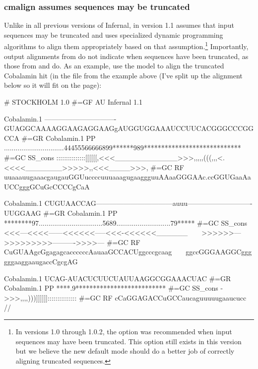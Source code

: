 \subsubsection{cmalign assumes sequences may be truncated}
Unlike in all previous versions of Infernal,  in version
1.1 assumes that input sequences may be truncated and uses specialized
dynamic programming algorithms to align them appropriately based on
that assumption.\footnote{In versions 1.0 through 1.0.2, the
    option was recommended when input
  sequences may have been truncated. This option still exists in this
  version but we believe the new default mode should do a better job
  of correctly aligning truncated sequences.} Importantly, output
alignments from  do not indicate when sequences have
been truncated, as those from  and  do. As
an example, use the  model to align the
truncated Cobalamin hit (in the file 
from the  example above (I've split up the alignment
below so it will fit on the page):


\begin{sreoutput}
# STOCKHOLM 1.0
#=GF AU Infernal 1.1

Cobalamin.1         -------------------------------GUAGGCAAAAGGAAGAGGAAGgAUGGUGGAAAUCCUUCACGGGCCCGGCCA
#=GR Cobalamin.1 PP ...............................44455566666899******989****************************
#=GC SS_cons        :::::::::::::::[[[[[[,<<<____________>>>,,,,,(((,,,<.<<<<_______>>>>>,,<<<____>>>,
#=GC RF             uuaaauugaaacgaugauGGUuccccuuuaaagugaaggguuAAaaGGGAAc.ccGGUGaaAaUCCgggGCuGcCCCCgCaA

Cobalamin.1         CUGUAACCAG---------------------------------auuu----------------------------UUGGAAG
#=GR Cobalamin.1 PP ********97.................................5689............................79*****
#=GC SS_cons        <<<---<<<<------<<<<<<-----<<<-<<<<<<______~~~~>>>>>>--->>>>>>>>>---------->>>>---
#=GC RF             CuGUAAgcGgagagcaccccccAauaaGCCACUggcccgcaag~~~~ggccGGGAAGGCggggggaaggaaugaccCgcgAG

Cobalamin.1         UCAG-AUACUCUUCUAUUAAGGCGGAAACUAC
#=GR Cobalamin.1 PP ****.9**************************
#=GC SS_cons        ->>>,,,,)))]]]]]]:::::::::::::::
#=GC RF             cCaGGAGACCuGCCaucaguuuuugaaucucc
//
\end{sreoutput}

